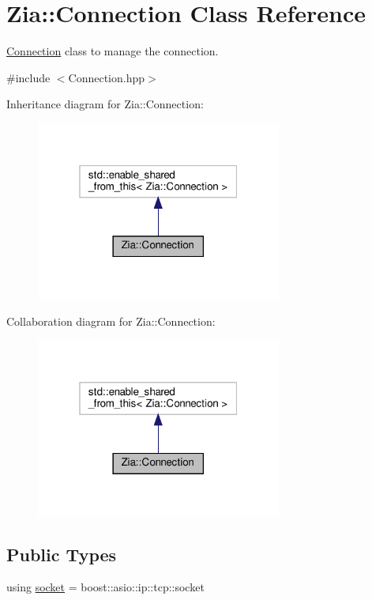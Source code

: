 \hypertarget{class_zia_1_1_connection}{}\section{Zia\+:\+:Connection Class Reference}
\label{class_zia_1_1_connection}


\hyperlink{class_zia_1_1_connection}{Connection} class to manage the connection.  




{\ttfamily \#include $<$Connection.\+hpp$>$}



Inheritance diagram for Zia\+:\+:Connection\+:\nopagebreak
\begin{figure}[H]
\begin{center}
\leavevmode
\includegraphics[width=229pt]{class_zia_1_1_connection__inherit__graph}
\end{center}
\end{figure}


Collaboration diagram for Zia\+:\+:Connection\+:\nopagebreak
\begin{figure}[H]
\begin{center}
\leavevmode
\includegraphics[width=229pt]{class_zia_1_1_connection__coll__graph}
\end{center}
\end{figure}
\subsection*{Public Types}
\begin{DoxyCompactItemize}
\item 
using \hyperlink{class_zia_1_1_connection_a1b74e276e0f3aa8dbabdaed80a0936e6}{socket} = boost\+::asio\+::ip\+::tcp\+::socket
\end{DoxyCompactItemize}
